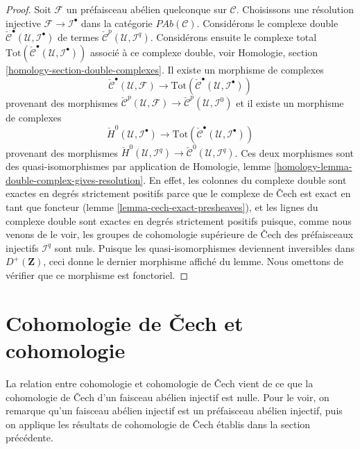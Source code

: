 \begin{proof}
\medskip\noindent
Soit $\mathcal{F}$ un préfaisceau abélien quelconque sur $\mathcal{C}$.
Choisissons une résolution injective $\mathcal{F} \to \mathcal{I}^\bullet$
dans la catégorie $\textit{PAb}(\mathcal{C})$.
Considérons le complexe double
$\check{\mathcal{C}}^\bullet(\mathcal{U}, \mathcal{I}^\bullet)$
de termes $\check{\mathcal{C}}^p(\mathcal{U}, \mathcal{I}^q)$.
Considérons ensuite le complexe total
$\text{Tot}(\check{\mathcal{C}}^\bullet(\mathcal{U}, \mathcal{I}^\bullet))$
associé à ce complexe double, voir
Homologie, section \ref{homology-section-double-complexes}.
Il existe un morphisme de complexes
$$
\check{\mathcal{C}}^\bullet(\mathcal{U}, \mathcal{F})
\longrightarrow
\text{Tot}(\check{\mathcal{C}}^\bullet(\mathcal{U}, \mathcal{I}^\bullet))
$$
provenant des morphismes
$\check{\mathcal{C}}^p(\mathcal{U}, \mathcal{F})
\to \check{\mathcal{C}}^p(\mathcal{U}, \mathcal{I}^0)$
et il existe un morphisme de complexes
$$
\check{H}^0(\mathcal{U}, \mathcal{I}^\bullet)
\longrightarrow
\text{Tot}(\check{\mathcal{C}}^\bullet(\mathcal{U}, \mathcal{I}^\bullet))
$$
provenant des morphismes
$\check{H}^0(\mathcal{U}, \mathcal{I}^q) \to
\check{\mathcal{C}}^0(\mathcal{U}, \mathcal{I}^q)$.
Ces deux morphismes sont des quasi-isomorphismes par application de
Homologie, lemme \ref{homology-lemma-double-complex-gives-resolution}.
En effet, les colonnes du complexe double sont exactes en degrés strictement positifs
parce que le complexe de {\v C}ech est exact en tant que foncteur
(lemme \ref{lemma-cech-exact-presheaves}),
et les lignes du complexe double sont exactes en degrés strictement positifs
puisque, comme nous venons de le voir, les groupes de cohomologie supérieure de {\v C}ech des
préfaisceaux injectifs $\mathcal{I}^q$ sont nuls.
Puisque les quasi-isomorphismes deviennent inversibles
dans $D^{+}(\mathbf{Z})$, ceci donne le dernier morphisme affiché
du lemme. Nous omettons de vérifier que ce morphisme est
fonctoriel.
\end{proof}





\section{Cohomologie de {\v C}ech et cohomologie}
\label{section-cech-cohomology-cohomology}

\noindent
La relation entre cohomologie et cohomologie de {\v C}ech vient de ce que la
cohomologie de {\v C}ech d'un faisceau abélien injectif est nulle. Pour le voir,
on remarque qu'un faisceau abélien injectif est un préfaisceau abélien injectif,
puis on applique les résultats de cohomologie de {\v C}ech établis dans la
section précédente.

